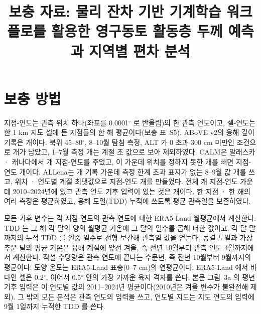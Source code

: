 \documentclass[pdflatex,sn-nature]{sn-jnl}
\begin{document}
\title{보충 자료: 물리 잔차 기반 기계학습 워크플로를 활용한 영구동토 활동층 두께 예측과 지역별 편차 분석}
\author[1]{}
\maketitle

\section{보충 방법}

지점-연도는 관측 위치 하나(좌표를 0.0001$^\circ$ 로 반올림)의 한 관측 연도이고, 셀-연도는 한 1 km 지도 셀에 든 지점들의 한 해 평균이다(보충 표~S5). ABoVE v2\cite{Moore2025}의 융해 깊이 기록은 \nqcAboveRaw{}개이다. 북위 45--80$^\circ$, 8--10월 탐침 측정, ALT 가 0 초과 300 cm 미만인 조건으로 \nqcAboveKept{}개가 남았고, 1--7월 측정 \nqcAboveEarly{}개는 계절 초 값으로 보아 제외하였다. CALM\cite{Streletskiy2025}은 알래스카 · 캐나다에서 \nqcCalmSy{}개 지점-연도를 주었고, 이 가운데 위치를 정하지 못한 \nqcCalmNoloc{}개를 빼면 지점-연도 \nqcCalmCy{}개이다. ALLena\cite{Veremeeva2025}는 \nqcLenaRaw{}개 기록 가운데 측정 한계 초과 표지가 없는 8--9월 값 \nqcLenaEos{}개를 쓰고, 위치 · 연도별 계절 최댓값으로 지점-연도 \nqcLenaCy{}개를 만들었다. 전체 \nqcTotalCy{}개 지점-연도 가운데 2010--2024년에 있고 관측 연도 기후 입력이 있는 것은 \nqcTotalCyIn{}개이다. 한 지점 · 한 해의 여러 측정은 평균하였고, 융해 도일(TDD) 누적에 쓰도록 평균 관측일을 보존하였다.

모든 기후 변수는 각 지점-연도의 관측 연도에 대한 ERA5-Land 월평균에서 계산한다. TDD 는 그 해 각 달의 양의 월평균 기온에 그 달의 일수를 곱해 더한 값이고, 각 달 말까지의 누적 TDD 를 연중 일수로 선형 보간해 관측일 값을 얻는다. 동결 도일과 가장 추운 달의 평균 기온은 융해 계절에 앞선 겨울, 즉 전년 10월부터 관측 연도 4월까지에서 계산한다. 적설 수당량은 관측 연도에 끝나는 수문년, 즉 전년 10월부터 9월까지의 평균이다. 토양 온도는 ERA5-Land 표층(0--7 cm)의 연평균이다. ERA5-Land 에서 바다인 셀은 0.2$^\circ$, 이어서 0.5$^\circ$ 안의 가장 가까운 육지 격자를 쓴다. 본문 그림~3a 의 평년 기후 입력은 이 연도별 값의 2011--2024년 평균이다(2010년은 겨울 변수가 불완전해 제외). 그 밖의 모든 분석은 관측 연도의 입력을 쓰고, 연도별 지도는 지도 연도의 입력에 9월 1일까지 누적한 TDD 를 쓴다.
\end{document}
